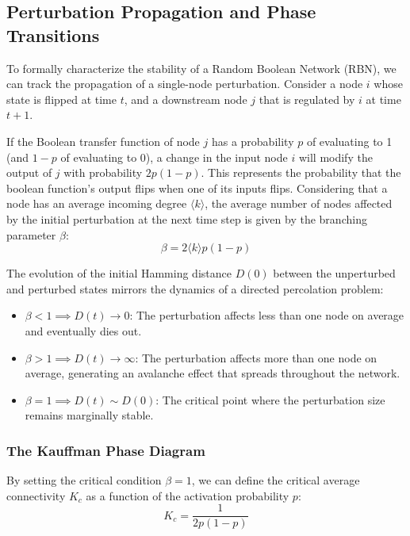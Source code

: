 \subsection{Perturbation Propagation and Phase Transitions}
\label{subsec:rbn_perturbation}

To formally characterize the stability of a Random Boolean Network (RBN), we can track the propagation of a single-node perturbation. Consider a node \(i\) whose state is flipped at time \(t\), and a downstream node \(j\) that is regulated by \(i\) at time \(t+1\).

If the Boolean transfer function of node \(j\) has a probability \(p\) of evaluating to 1 (and \(1-p\) of evaluating to 0), a change in the input node \(i\) will modify the output of \(j\) with probability \(2p(1-p)\). This represents the probability that the boolean function's output flips when one of its inputs flips.
Considering that a node has an average incoming degree \(\langle k \rangle\), the average number of nodes affected by the initial perturbation at the next time step is given by the branching parameter \(\beta\):
\[
    \beta = 2 \langle k \rangle p(1 - p)
\]

The evolution of the initial Hamming distance \(D(0)\) between the unperturbed and perturbed states mirrors the dynamics of a directed percolation problem:
\begin{itemize}
    \item \(\beta < 1 \implies D(t) \to 0\): The perturbation affects less than one node on average and eventually dies out.
    \item \(\beta > 1 \implies D(t) \to \infty\): The perturbation affects more than one node on average, generating an avalanche effect that spreads throughout the network.
    \item \(\beta = 1 \implies D(t) \sim D(0)\): The critical point where the perturbation size remains marginally stable.
\end{itemize}

\subsubsection{The Kauffman Phase Diagram}
\label{subsubsec:kauffman_phase_diagram}

By setting the critical condition \(\beta = 1\), we can define the critical average connectivity \(K_c\) as a function of the activation probability \(p\):
\[
    K_c = \frac{1}{2p(1 - p)}
\]


